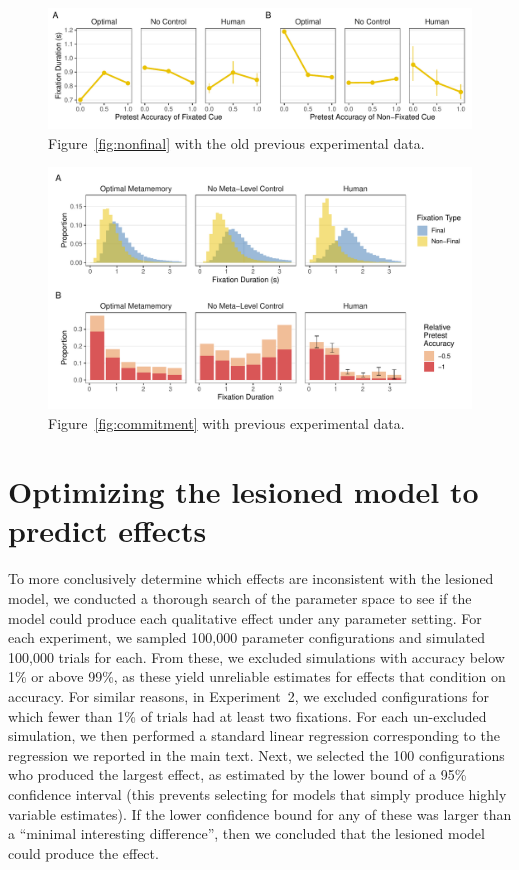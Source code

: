 \begin{figure}[t]
  \includegraphics[scale=.75]{figs/memory/old_exp2/nonfinal.pdf}
  \caption{Figure~\ref{fig:nonfinal} with the old previous experimental data.
    \label{fig:old_nonfinal}
}
\end{figure}

\begin{figure}[t]
  \includegraphics[scale=.75]{figs/memory/old_exp2/commitment.pdf}
  \caption{Figure~\ref{fig:commitment} with previous experimental data.
    \label{fig:old_commitment}
}
\end{figure}

\section{Optimizing the lesioned model to predict effects}\label{app:lesion-search}

To more conclusively determine which effects are inconsistent with the lesioned model, we conducted a thorough search of the parameter space to see if the model could produce each qualitative effect under any parameter setting. For each experiment, we sampled 100,000 parameter configurations and simulated 100,000 trials for each. From these, we excluded simulations with accuracy below 1\% or above 99\%, as these yield unreliable estimates for effects that condition on accuracy. For similar reasons, in Experiment~2, we excluded configurations for which fewer than 1\% of trials had at least two fixations. For each un-excluded simulation, we then performed a standard linear regression corresponding to the regression we reported in the main text. Next, we selected the 100 configurations who produced the largest effect, as estimated by the lower bound of a 95\% confidence interval (this prevents selecting for models that simply produce highly variable estimates). If the lower confidence bound for any of these was larger than a ``minimal interesting difference'', then we concluded that the lesioned model could produce the effect.

